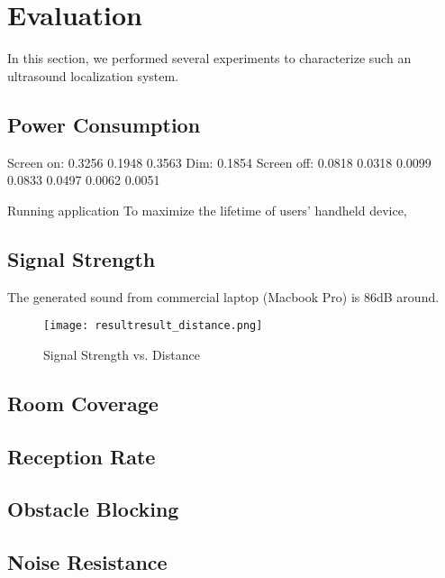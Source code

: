 \section{Evaluation}
\label{sec:evaluation}

In this section, we performed several experiments to characterize such an ultrasound localization system.

\subsection{Power Consumption}
\label{sec:power-consumption}

Screen on: 0.3256 0.1948 0.3563
Dim: 0.1854
Screen off: 0.0818 0.0318 0.0099 0.0833 0.0497 0.0062 0.0051


Running application
To maximize the lifetime of users' handheld device, 

\subsection{Signal Strength}
\label{sec:signal-strength}
The generated sound from commercial laptop (Macbook Pro) is 86dB around.

\begin{figure}
  \centering
  \texttt{[image: resultresult\_distance.png]}
  \caption{Signal Strength vs. Distance}
  \label{fig:strength}
\end{figure}

\subsection{Room Coverage}
\label{sec:room-coverage}

\subsection{Reception Rate}
\label{sec:reception-rate}

\subsection{Obstacle Blocking}
\label{sec:obstacle-blocking}

\subsection{Noise Resistance}
\label{sec:noise-resistance}



